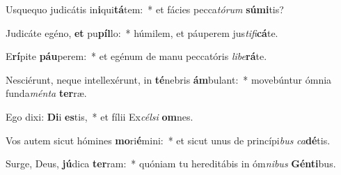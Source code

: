 \item Usquequo judicátis in\textbf{i}qui\textbf{tá}tem:~* et fácies pecca\textit{tó}\textit{rum} \textbf{sú}\textbf{mi}tis?
\item Judicáte egéno, \textbf{et} pu\textbf{píl}lo:~* húmilem, et páuperem jus\textit{ti}\textit{fi}\textbf{cá}te.
\item E\textbf{rí}pite \textbf{páu}perem:~* et egénum de manu peccatóris \textit{li}\textit{be}\textbf{rá}te.
\item Nesciérunt, neque intellexérunt, in \textbf{té}nebris \textbf{ám}bulant:~* movebúntur ómnia funda\textit{mén}\textit{ta} \textbf{ter}ræ.
\item Ego dixi: \textbf{Di}i \textbf{es}tis,~* et fílii Ex\textit{cél}\textit{si} \textbf{om}nes.
\item Vos autem sicut hómines \textbf{mo}ri\textbf{é}mini:~* et sicut unus de princípi\textit{bus} \textit{ca}\textbf{dé}tis.
\item Surge, Deus, \textbf{jú}dica \textbf{ter}ram:~* quóniam tu hereditábis in óm\textit{ni}\textit{bus} \textbf{Gén}\textbf{ti}bus.
